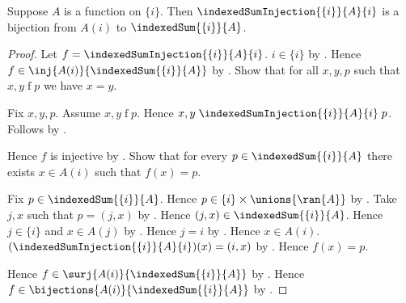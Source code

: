 \begin{theorem}\label{singleton_indexed_sum_injection_is_bijection}
    Suppose $A$ is a function on $\{i\}$.
    Then $\indexedSumInjection{\{i\}}{A}{i}$ is a bijection from
        $A(i)$ to $\indexedSum{\{i\}}{A}$.
\end{theorem}
\begin{proof}
    Let $f=\indexedSumInjection{\{i\}}{A}{i}$.
    $i\in\{i\}$ by .
    Hence $f\in\inj{A(i)}{\indexedSum{\{i\}}{A}}$ by
        .
    Show that for all $x,y,p$ such that $x,y\mathrel{f}p$ we have
        $x=y$.
    \begin{subproof}
        Fix $x,y,p$.
        Assume $x,y\mathrel{f}p$.
        Hence $x,y\mathrel{\indexedSumInjection{\{i\}}{A}{i}}p$.
        Follows by .
    \end{subproof}
    Hence $f$ is injective by .
    Show that for every $p\in\indexedSum{\{i\}}{A}$ there exists
        $x\in A(i)$ such that
        $f(x)=p$.
    \begin{subproof}
        Fix $p\in\indexedSum{\{i\}}{A}$.
        Hence $p\in\{i\}\times\unions{\ran{A}}$ by
            .
        Take $j,x$ such that $p=(j,x)$ by
            .
        Hence $(j,x)\in\indexedSum{\{i\}}{A}$.
        Hence $j\in\{i\}$ and $x\in A(j)$ by
            .
        Hence $j=i$ by .
        Hence $x\in A(i)$.
        $(\indexedSumInjection{\{i\}}{A}{i})(x)=(i,x)$ by
            .
        Hence $f(x)=p$.
    \end{subproof}
    Hence $f\in\surj{A(i)}{\indexedSum{\{i\}}{A}}$ by .
    Hence $f\in\bijections{A(i)}{\indexedSum{\{i\}}{A}}$ by
        .
\end{proof}
